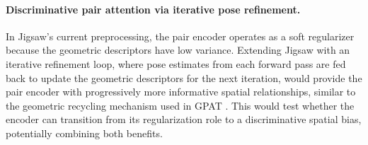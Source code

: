 \paragraph{Discriminative pair attention via iterative pose refinement.} In Jigsaw's current preprocessing, the pair encoder operates as a soft regularizer because the geometric descriptors have low variance. Extending Jigsaw with an iterative refinement loop, where pose estimates from each forward pass are fed back to update the geometric descriptors for the next iteration, would provide the pair encoder with progressively more informative spatial relationships, similar to the geometric recycling mechanism used in GPAT \cite{Li2023GPAT}. This would test whether the encoder can transition from its regularization role to a discriminative spatial bias, potentially combining both benefits.
